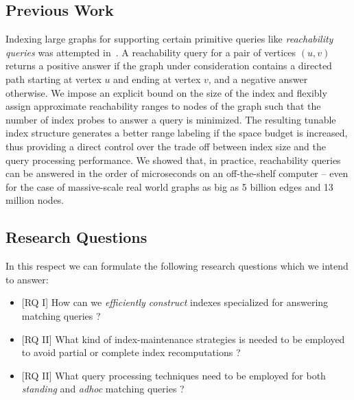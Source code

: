\subsection{Previous Work}
Indexing large graphs for supporting certain primitive queries like \emph{reachability queries} was attempted in~\cite{seufert2013ferrari}. A reachability query for a pair of vertices $(u,v)$ returns a positive answer if the graph under consideration contains a directed path starting at vertex $u$ and ending at vertex $v$, and a negative answer otherwise. We impose an explicit bound on the size of the index and flexibly assign approximate reachability ranges to nodes of the graph such that the number of index probes to answer a query is minimized. The resulting tunable index structure generates a better range labeling if the space budget is increased, thus providing a direct control over the trade off between index size and the query processing performance. We showed that, in practice, reachability queries can be answered in the order of microseconds on an off-the-shelf computer – even for the case of massive-scale real world graphs as big as 5 billion edges and 13 million nodes.


\subsection{Research Questions} 	
In this respect we can formulate the following research questions which we intend to answer:
\begin{itemize}
	\item \textsf{[RQ I]} How can we \emph{efficiently construct} indexes specialized for answering matching queries ? 

	\item \textsf{[RQ II]} What kind of index-maintenance strategies is needed to be employed to avoid partial or complete index recomputations ?

	\item \textsf{[RQ II]} What query processing techniques need to be employed for both \emph{standing} and \emph{adhoc} matching queries ?

\end{itemize}

